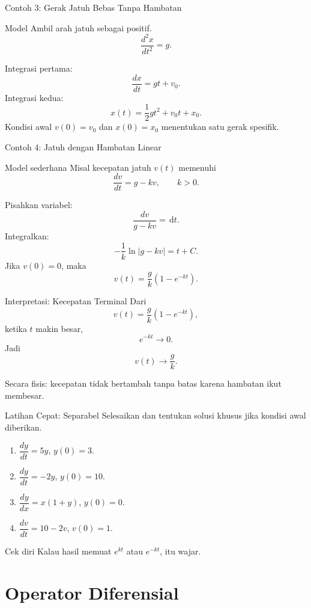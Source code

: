 \documentclass[aspectratio=169,11pt]{beamer}
\newcommand{\dd}{\,\mathrm{d}}
\begin{document}
\begin{frame}{Contoh 3: Gerak Jatuh Bebas Tanpa Hambatan}
\begin{block}{Model}
Ambil arah jatuh sebagai positif.
\[
\frac{d^2x}{dt^2}=g.
\]
\end{block}
Integrasi pertama:
\[
\frac{dx}{dt}=gt+v_0.
\]
Integrasi kedua:
\[
\boxed{x(t)=\frac{1}{2}gt^2+v_0t+x_0.}
\]
\vspace{0.1cm}
Kondisi awal $v(0)=v_0$ dan $x(0)=x_0$ menentukan satu gerak spesifik.
\end{frame}

\begin{frame}{Contoh 4: Jatuh dengan Hambatan Linear}
\begin{block}{Model sederhana}
Misal kecepatan jatuh $v(t)$ memenuhi
\[
\frac{dv}{dt}=g-kv, \qquad k>0.
\]
\end{block}
Pisahkan variabel:
\[
\frac{dv}{g-kv}=\dd t.
\]
Integralkan:
\[
-\frac{1}{k}\ln|g-kv|=t+C.
\]
Jika $v(0)=0$, maka
\[
\boxed{v(t)=\frac{g}{k}\left(1-e^{-kt}\right).}
\]
\end{frame}

\begin{frame}{Interpretasi: Kecepatan Terminal}
Dari
\[
 v(t)=\frac{g}{k}\left(1-e^{-kt}\right),
\]
ketika $t$ makin besar,
\[
 e^{-kt}\to 0.
\]
Jadi
\[
\boxed{v(t)\to \frac{g}{k}.}
\]
\begin{center}
Secara fisis: kecepatan tidak bertambah tanpa batas karena hambatan ikut membesar.
\end{center}
\end{frame}

\begin{frame}{Latihan Cepat: Separabel}
Selesaikan dan tentukan solusi khusus jika kondisi awal diberikan.
\begin{enumerate}
  \item $\dfrac{dy}{dt}=5y$, $y(0)=3$.
  \item $\dfrac{dy}{dt}=-2y$, $y(0)=10$.
  \item $\dfrac{dy}{dx}=x(1+y)$, $y(0)=0$.
  \item $\dfrac{dv}{dt}=10-2v$, $v(0)=1$.
\end{enumerate}
\vspace{0.2cm}
\begin{alertblock}{Cek diri}
Kalau hasil memuat $e^{kt}$ atau $e^{-kt}$, itu wajar.
\end{alertblock}
\end{frame}

\section{Operator Diferensial}
\end{document}
